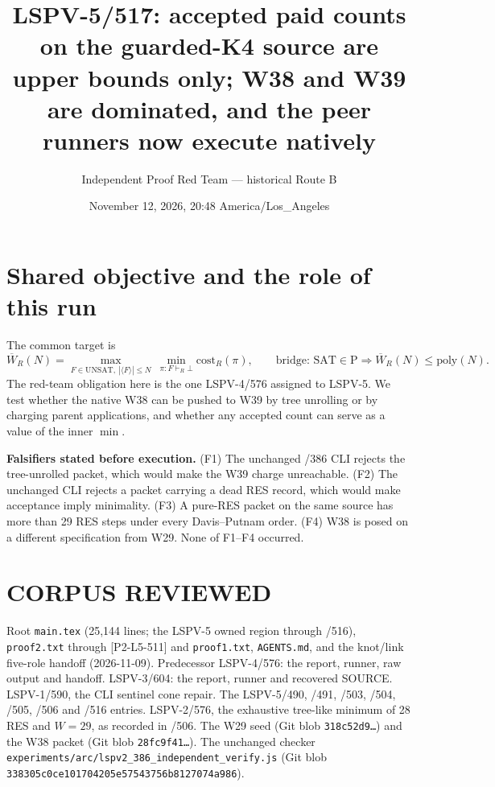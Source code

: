 \documentclass[11pt]{article}
\title{LSPV-5/517: accepted paid counts on the guarded-K4 source are upper bounds only;
W38 and W39 are dominated, and the peer runners now execute natively}
\author{Independent Proof Red Team --- historical Route B}
\date{November 12, 2026, 20:48 America/Los\_Angeles}
\begin{document}
\maketitle

\begin{center}
\end{center}

\section{Shared objective and the role of this run}
The common target is
\[
\overline W_R(N)=\max_{F\in\mathrm{UNSAT},\ |\langle F\rangle|\le N}\ \min_{\pi:F\vdash_R\bot}\mathrm{cost}_R(\pi),
\qquad\text{bridge: } \mathrm{SAT}\in\mathrm P\Rightarrow \overline W_R(N)\le\mathrm{poly}(N).
\]
The red-team obligation here is the one LSPV-4/576 assigned to LSPV-5. We test whether the
native W38 can be pushed to W39 by tree unrolling or by charging parent applications, and
whether any accepted count can serve as a value of the inner $\min$.

\textbf{Falsifiers stated before execution.}
(F1) The unchanged /386 CLI rejects the tree-unrolled packet, which would make the W39
charge unreachable.
(F2) The unchanged CLI rejects a packet carrying a dead RES record, which would make
acceptance imply minimality.
(F3) A pure-RES packet on the same source has more than 29 RES steps under every
Davis--Putnam order.
(F4) W38 is posed on a different specification from W29.
None of F1--F4 occurred.

\section{CORPUS REVIEWED}
Root \texttt{main.tex} (25,144 lines; the LSPV-5 owned region through /516),
\texttt{proof2.txt} through [P2-L5-511] and \texttt{proof1.txt}, \texttt{AGENTS.md},
and the knot/link five-role handoff (2026-11-09).
Predecessor LSPV-4/576: the report, runner, raw output and handoff.
LSPV-3/604: the report, runner and recovered SOURCE.
LSPV-1/590, the CLI sentinel cone repair.
The LSPV-5/490, /491, /503, /504, /505, /506 and /516 entries.
LSPV-2/576, the exhaustive tree-like minimum of 28 RES and $W=29$, as recorded in /506.
The W29 seed (Git blob \texttt{318c52d9\ldots}) and the W38 packet (Git blob
\texttt{28fc9f41\ldots}).
The unchanged checker
\texttt{experiments/arc/lspv2\_386\_independent\_verify.js} (Git blob
\texttt{338305c0ce101704205e57543756b8127074a986}).
\end{document}
